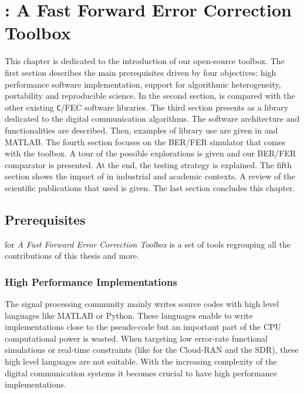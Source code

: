 
\renewcommand{\curChapter}{main/chapter3}

\chapter{\AFFECT: A Fast Forward Error Correction Toolbox}
\label{chap:aff3ct}

This chapter is dedicated to the introduction of our \AFFECT open-source
toolbox. The first section describes the main prerequisites driven by four
objectives: high performance software implementation, support for algorithmic
heterogeneity, portability and reproducible science. In the second section,
\AFFECT is compared with the other existing \verb|C|/\Cxx FEC software
libraries. The third section presents \AFFECT as a library dedicated to the
digital communication algorithms. The software architecture and functionalities
are described. Then, examples of library use are given in \Cxx and MATLAB. The
fourth section focuses on the \AFFECT BER/FER simulator that comes with the
toolbox. A tour of the possible explorations is given and our BER/FER comparator
is presented. At the end, the \AFFECT testing strategy is explained. The fifth
section shows the impact of \AFFECT in industrial and academic contexts. A
review of the scientific publications that used \AFFECT is given. The last
section concludes this chapter.

\vspace*{\fill}
\minitoccustom
\vspace*{\fill}

\newpage
\section{Prerequisites}

\AFFECT for \emph{A Fast Forward Error Correction Toolbox} is a set of tools
regrouping all the contributions of this thesis and more.

\subsection{High Performance Implementations}

The signal processing community mainly writes source codes with high level
languages like MATLAB or Python. These languages enable to write implementations
close to the pseudo-code but an important part of the CPU computational power is
wasted. When targeting low error-rate functional simulations or real-time
constraints (like for the Cloud-RAN and the SDR), these high level languages are
not suitable. With the increasing complexity of the digital communication
systems it becomes crucial to have high performance implementations.

